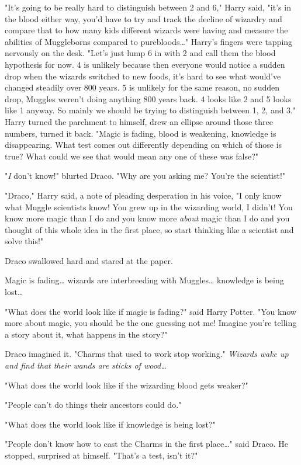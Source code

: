 "It's going to be really hard to distinguish between 2 and 6," Harry said,
"it's in the blood either way, you'd have to try and track the decline of
wizardry and compare that to how many kids different wizards were having and
measure the abilities of Muggleborns compared to purebloods{\ldots}" Harry's
fingers were tapping nervously on the desk. "Let's just lump 6 in with 2 and
call them the blood hypothesis for now. 4 is unlikely because then everyone
would notice a sudden drop when the wizards switched to new foods, it's hard to
see what would've changed steadily over 800 years. 5 is unlikely for the same
reason, no sudden drop, Muggles weren't doing anything 800 years back. 4 looks
like 2 and 5 looks like 1 anyway. So mainly we should be trying to distinguish
between 1, 2, and 3." Harry turned the parchment to himself, drew an ellipse
around those three numbers, turned it back. "Magic is fading, blood is
weakening, knowledge is disappearing. What test comes out differently depending
on which of those is true? What could we see that would mean any one of these
was false?"

"\emph{I} don't know!" blurted Draco. "Why are you asking me? You're the
scientist!"

"Draco," Harry said, a note of pleading desperation in his voice, "I only know
what Muggle scientists know! You grew up in the wizarding world, I didn't! You
know more magic than I do and you know more \emph{about} magic than I do and
you thought of this whole idea in the first place, so start thinking like a
scientist and solve this!"

Draco swallowed hard and stared at the paper.

Magic is fading{\ldots} wizards are interbreeding with Muggles{\ldots}
knowledge is being lost{\ldots}

"What does the world look like if magic is fading?" said Harry Potter. "You
know more about magic, you should be the one guessing not me! Imagine you're
telling a story about it, what happens in the story?"

Draco imagined it. "Charms that used to work stop working." \emph{Wizards wake
up and find that their wands are sticks of wood{\ldots}}

"What does the world look like if the wizarding blood gets weaker?"

"People can't do things their ancestors could do."

"What does the world look like if knowledge is being lost?"

"People don't know how to cast the Charms in the first place{\ldots}" said
Draco. He stopped, surprised at himself. "That's a test, isn't it?"

